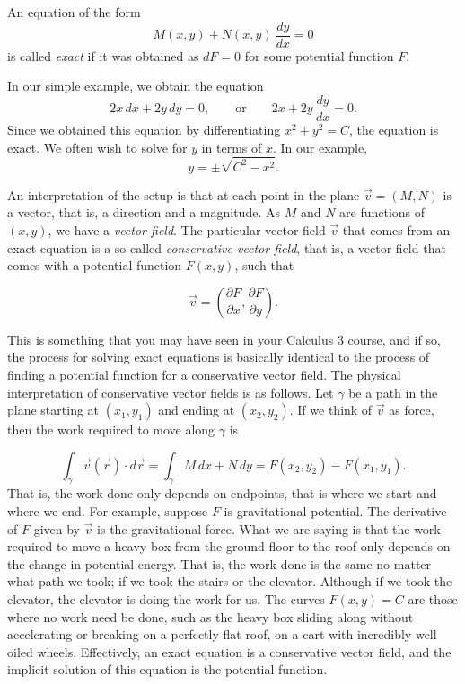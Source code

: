 \documentclass{ximera}
\begin{document}
\begin{definition}
    An equation of the form
\[ 
    M(x,y) + N(x, y)\ \frac{dy}{dx} = 0 
\]
is called \emph{exact} if it was obtained as $dF = 0$ for some potential function $F$.
\end{definition}

In our simple example, we obtain the equation
\begin{equation*}
    2x \, dx + 2y \, dy = 0, \qquad \text{or} \qquad 2x + 2y \, \frac{dy}{dx} = 0 .
\end{equation*}
Since we obtained this equation by differentiating $x^2+y^2=C$,  the equation is exact. We often wish to solve for $y$ in terms of $x$.  In our example,
\begin{equation*}
    y = \pm \sqrt{C^2-x^2} .
\end{equation*}

An interpretation of the setup is that at each point in the plane $\vec{v} = (M,N)$ is a vector, that is, a direction and a magnitude. As $M$ and $N$ are functions of $(x,y)$, we have a \emph{vector field}.  The particular  vector field $\vec{v}$ that comes from an exact equation is a so-called \emph{conservative vector field}, that is, a vector field that comes with a potential function $F(x,y)$, such that

\begin{equation*}
    \vec{v} = \left( \frac{\partial F}{\partial x} ,\frac{\partial F}{\partial y} \right) .
\end{equation*} 

This is something that you may have seen in your Calculus 3 course, and if so, the process for solving exact equations is basically identical to the process of finding a potential function for a conservative vector field.  The physical interpretation of conservative vector fields is as follows. Let $\gamma$ be a path in the plane starting at $(x_1,y_1)$ and ending at $(x_2,y_2)$. If we think of $\vec{v}$ as force, then the work required to move along $\gamma$ is

\begin{equation*}
    \int_\gamma \vec{v}(\vec{r}) \cdot d\vec{r} = \int_\gamma M \, dx + N \, dy = F(x_2,y_2) - F(x_1,y_1) .
\end{equation*}
That is, the work done only depends on endpoints, that is where we start and where we end.   For example, suppose $F$ is gravitational potential.  The derivative of $F$ given by $\vec{v}$ is the gravitational force. What we are saying is that the work required to move a heavy box from the ground floor to the roof only depends on the change in potential energy.  That is, the work done is the same no matter what path we took; if we took the stairs or the elevator. Although if we took the elevator, the elevator is doing the work for us. The curves $F(x,y) = C$ are those where no work need be done, such as the heavy box sliding along without accelerating or breaking on a perfectly flat roof, on a cart with incredibly well oiled wheels. Effectively, an exact equation is a conservative vector field, and the implicit solution of this equation is the potential function. 
\end{document}
